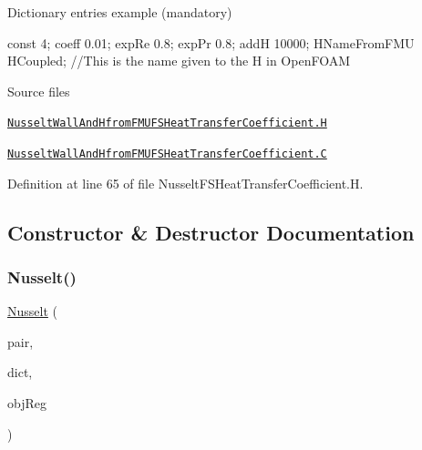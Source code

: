 Dictionary entries example (mandatory) \begin{DoxyVerb}    const   4;
    coeff   0.01;
    expRe   0.8;
    expPr   0.8;
    addH    10000;
    HNameFromFMU   HCoupled; //This is the name given to the H in OpenFOAM
\end{DoxyVerb}


\begin{DoxyParagraph}{Source files}

\begin{DoxyItemize}
\item \href{../../../home/carlo/data/GeN-Foam/GeN-Foam_ffn/GeN-Foam/GeN-Foam/classes/thermalHydraulics/src/physicsModels/heatTransferModels/FSHeatTransferCoefficientModels/NusseltWallAndHfromFMU/NusseltWallAndHfromFMUFSHeatTransferCoefficient.H}{\tt Nusselt\+Wall\+And\+Hfrom\+F\+M\+U\+F\+S\+Heat\+Transfer\+Coefficient.\+H} 
\item \href{../../../home/carlo/data/GeN-Foam/GeN-Foam_ffn/GeN-Foam/GeN-Foam/classes/thermalHydraulics/src/physicsModels/heatTransferModels/FSHeatTransferCoefficientModels/NusseltWallAndHfromFMU/NusseltWallAndHfromFMUFSHeatTransferCoefficient.C}{\tt Nusselt\+Wall\+And\+Hfrom\+F\+M\+U\+F\+S\+Heat\+Transfer\+Coefficient.\+C} 
\end{DoxyItemize}
\end{DoxyParagraph}


Definition at line 65 of file Nusselt\+F\+S\+Heat\+Transfer\+Coefficient.\+H.



\subsection{Constructor \& Destructor Documentation}
\mbox{\label{classFoam_1_1FSHeatTransferCoefficientModels_1_1Nusselt_ae66ec9cbf9ddee2181cf4fef512c7c0b}} 
\subsubsection{\texorpdfstring{Nusselt()}{Nusselt()}}
{\footnotesize\ttfamily \hyperlink{classFoam_1_1FSHeatTransferCoefficientModels_1_1Nusselt}{Nusselt} (\begin{DoxyParamCaption}\item[{const \hyperlink{classFoam_1_1FSPair}{F\+S\+Pair} \&}]{pair,  }\item[{const dictionary \&}]{dict,  }\item[{const object\+Registry \&}]{obj\+Reg }\end{DoxyParamCaption})}



